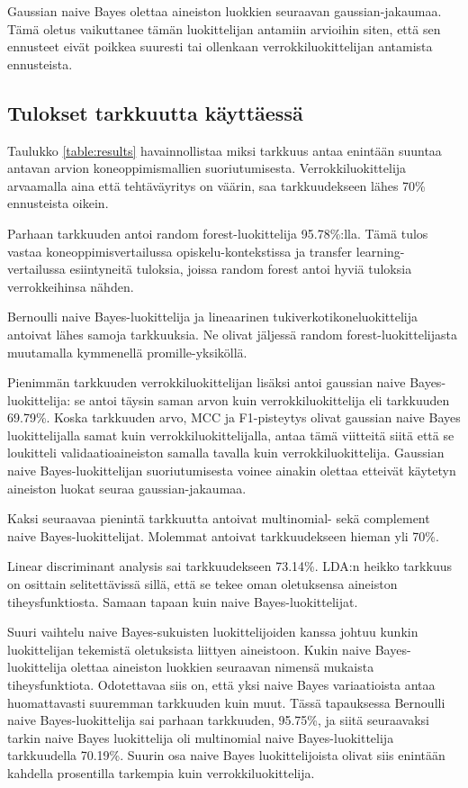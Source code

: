 \documentclass[finnish,twoside,openright]{HYgraduMLDS}
\begin{document}
Gaussian naive Bayes olettaa aineiston luokkien seuraavan gaussian-jakaumaa. Tämä oletus vaikuttanee tämän luokittelijan antamiin arvioihin siten, että sen ennusteet eivät poikkea suuresti tai ollenkaan verrokkiluokittelijan antamista ennusteista.


\subsection{Tulokset tarkkuutta käyttäessä}

Taulukko \ref{table:results} havainnollistaa miksi tarkkuus antaa enintään suuntaa antavan arvion koneoppimismallien suoriutumisesta. Verrokkiluokittelija arvaamalla aina että tehtäväyritys on väärin, saa tarkkuudekseen lähes 70\% ennusteista oikein.

Parhaan tarkkuuden antoi random forest-luokittelija 95.78\%:lla. Tämä tulos vastaa koneoppimisvertailussa \cite{Ahadi:2015:EML:2787622.2787717} opiskelu-kontekstissa ja transfer learning-vertailussa \cite{lagus2018transfer} esiintyneitä tuloksia, joissa random forest antoi hyviä tuloksia verrokkeihinsa nähden.

Bernoulli naive Bayes-luokittelija ja lineaarinen tukiverkotikoneluokittelija antoivat lähes samoja tarkkuuksia. Ne olivat jäljessä random forest-luokittelijasta muutamalla kymmenellä promille-yksiköllä.

Pienimmän tarkkuuden verrokkiluokittelijan lisäksi antoi gaussian naive Bayes-luokittelija: se antoi täysin saman arvon kuin verrokkiluokittelija eli tarkkuuden 69.79\%. Koska tarkkuuden arvo, MCC ja F1-pisteytys olivat gaussian naive Bayes luokittelijalla samat kuin verrokkiluokittelijalla, antaa tämä viitteitä siitä että se loukitteli validaatioaineiston samalla tavalla kuin verrokkiluokittelija. Gaussian naive Bayes-luokittelijan suoriutumisesta voinee ainakin olettaa etteivät käytetyn aineiston luokat seuraa gaussian-jakaumaa.

Kaksi seuraavaa pienintä tarkkuutta antoivat multinomial- sekä complement naive Bayes-luokittelijat. Molemmat antoivat tarkkuudekseen hieman yli 70\%.

Linear discriminant analysis sai tarkkuudekseen 73.14\%. LDA:n heikko tarkkuus on osittain selitettävissä sillä, että se tekee oman oletuksensa aineiston tiheysfunktiosta. Samaan tapaan kuin naive Bayes-luokittelijat.

Suuri vaihtelu naive Bayes-sukuisten luokittelijoiden kanssa johtuu kunkin luokittelijan tekemistä oletuksista liittyen aineistoon. Kukin naive Bayes-luokittelija olettaa aineiston luokkien seuraavan nimensä mukaista tiheysfunktiota. Odotettavaa siis on, että yksi naive Bayes variaatioista antaa huomattavasti suuremman tarkkuuden kuin muut. Tässä tapauksessa Bernoulli naive Bayes-luokittelija sai parhaan tarkkuuden, 95.75\%, ja siitä seuraavaksi tarkin naive Bayes luokittelija oli multinomial naive Bayes-luokittelija tarkkuudella 70.19\%. Suurin osa naive Bayes luokittelijoista olivat siis enintään kahdella prosentilla tarkempia kuin verrokkiluokittelija.
\end{document}
